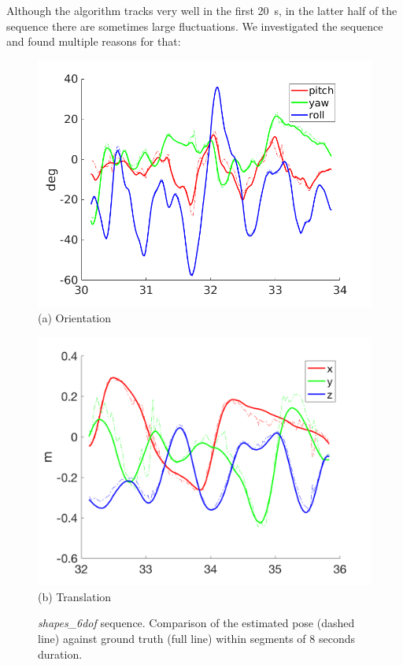 Although the algorithm tracks very well in the first \SI{20}{\second},
in the latter half of the sequence there are sometimes large
fluctuations. We investigated the sequence and found multiple reasons
for that:
\begin{figure}[H]
  \begin{minipage}[t]{0.48\textwidth}
    \centering \includegraphics[width =
    \textwidth]{images/shapes_6dof_rotation_33.png} (a) Orientation
  \end{minipage}
  \hfill
  \begin{minipage}[t]{0.48\textwidth}
    \centering \includegraphics[width =
    \textwidth]{images/shapes_6dof_translation_33.png} (b) Translation
  \end{minipage}
  \hfill
  \caption{\textit{shapes\_6dof} sequence. Comparison of the estimated
    pose (dashed line) against ground truth (full line) within
    segments of 8 seconds duration.}
  \label{fig:shapes_6dof_pose_zoomed}
\end{figure}

